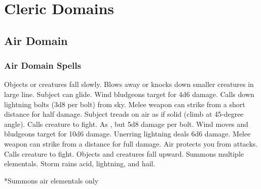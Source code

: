 \section{Cleric Domains}\label{Cleric Domains}

\begin{comment}
\subsection{Example Domain}
\parhead{Domain Power}
\parhead{Channelled Domain Power}
\parhead{Greater Domain Power}
\parhead{Greater Channelled Domain Power}
\parhead{Domain Mastery}
\begin{spelllist}
  \spellhead[1]{}
  \spellhead[1]{}
  \spellhead[2]{}
  \spellhead[2]{}
  \spellhead[3]{}
  \spellhead[3]{}
  \spellhead[4]{}
  \spellhead[4]{}
  \spellhead[5]{}
  \spellhead[5]{}
  \spellhead[6]{}
  \spellhead[6]{}
  \spellhead[7]{}
  \spellhead[7]{}
  \spellhead[8]{}
  \spellhead[8]{}
  \spellhead[9]{}
  \spellhead[9]{}
\end{spelllist}
\end{comment}

\subsection{Air Domain}

\subsubsection{Air Domain Spells}
\begin{spelllist}
   Objects or creatures fall slowly.
   Blows away or knocks down smaller creatures in large line.
   Subject can glide.
   Wind bludgeons target for 4d6 damage.
   Calls down lightning bolts (3d8 per bolt) from sky.
   Melee weapon can strike from a short distance for half damage.
   Subject treads on air as if solid (climb at 45-degree angle).
   Calls creature to fight.
   As , but 5d8 damage per bolt.
   Wind moves and bludgeons target for 10d6 damage.
   Unerring lightning deals 6d6 damage.
   Melee weapon can strike from a distance for full damage.
   Air protects you from attacks. 
   Calls creature to fight.
   Objects and creatures fall upward.
   Summons multiple elementals.
   Storm rains acid, lightning, and hail.
\end{spelllist}
*Summons air elementals only

